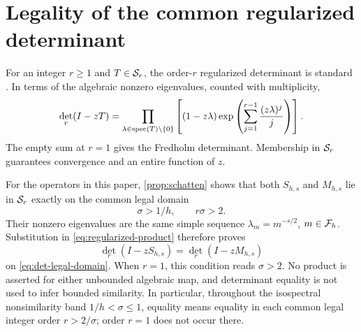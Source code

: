 \section{Legality of the common regularized determinant}
\label{app:determinants}

For an integer $r\ge1$ and $T\in\mathcal S_r$, the order-$r$ regularized
determinant is standard \cite[Ch.~9, pp.~75--80]{Simon2005}.  In terms of the algebraic
nonzero eigenvalues, counted with multiplicity,
\begin{equation}
  \det_r(I-zT)
  =\prod_{\lambda\in\operatorname{spec}(T)\setminus\{0\}}
    \left[(1-z\lambda)
      \exp\left(\sum_{j=1}^{r-1}\frac{(z\lambda)^j}{j}\right)
    \right].
  \label{eq:regularized-product}
\end{equation}
The empty sum at $r=1$ gives the Fredholm determinant.  Membership in
$\mathcal S_r$ guarantees convergence and an entire function of $z$.

For the operators in this paper, \cref{prop:schatten} shows that both
$S_{h,s}$ and $M_{h,s}$ lie in $\mathcal S_r$ exactly on the common legal domain
\begin{equation}
  \sigma>1/h,
  \qquad r\sigma>2.
  \label{eq:det-legal-domain}
\end{equation}
Their nonzero eigenvalues are the same simple sequence
$\lambda_m=m^{-s/2}$, $m\in\mathcal F_h$.  Substitution in
\cref{eq:regularized-product} therefore proves
\begin{equation}
  \det_r(I-zS_{h,s})=\det_r(I-zM_{h,s})
\end{equation}
on \cref{eq:det-legal-domain}.  When $r=1$, this condition reads
$\sigma>2$.  No product is asserted for either unbounded algebraic map, and
determinant equality is not used to infer bounded similarity.
In particular, throughout the isospectral nonsimilarity band
$1/h<\sigma\le1$, equality means equality in each common legal integer
order $r>2/\sigma$; order $r=1$ does not occur there.
